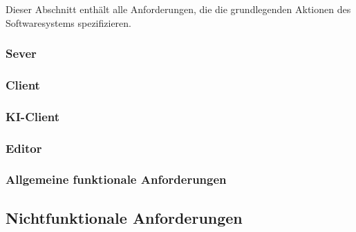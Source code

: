 \documentclass{uulm-assignment}
\begin{document}
Dieser Abschnitt enthält alle Anforderungen, die die grundlegenden Aktionen des Softwaresystems
spezifizieren.

\subsubsection{Sever}



\subsubsection{Client}

\subsubsection{KI-Client}

\subsubsection{Editor}

\subsubsection{Allgemeine funktionale Anforderungen}


\subsection{Nichtfunktionale Anforderungen}

\end{document}
